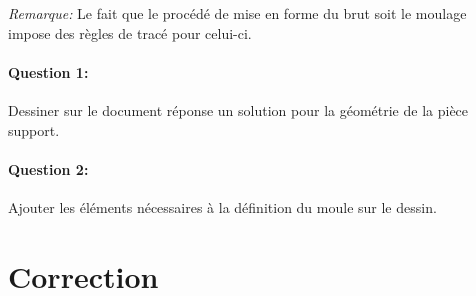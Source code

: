 \textit{Remarque:} Le fait que le procédé de mise en forme du brut soit le moulage impose des règles de tracé pour celui-ci.

\paragraph{Question 1:} Dessiner sur le document réponse un solution pour la géométrie de la pièce support.

\paragraph{Question 2:} Ajouter les éléments nécessaires à la définition du moule sur le dessin.



\clearpage

\ifdef{\public}{}{}

\newpage

\pagestyle{correction}

\section{Correction}


